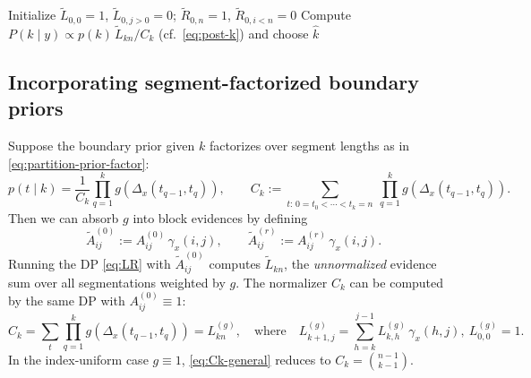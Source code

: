 \begin{algorithm}[H]
\caption{Generic algebraic DP for EF segmentation (prefix/suffix form)}
\label{alg:dp-core}
Initialize $\widetilde{L}_{0,0}=1$, $\widetilde{L}_{0,j>0}=0$; $\widetilde{R}_{0,n}=1$, $\widetilde{R}_{0,i<n}=0$\;
Compute $P(k\mid y)\propto p(k)\,\widetilde{L}_{k n}/C_k$ (cf.\ \eqref{eq:post-k}) and choose $\widehat{k}$\;
\end{algorithm}

\subsection{Incorporating segment-factorized boundary priors}
\label{subsec:priorinc}

Suppose the boundary prior given $k$ factorizes over segment lengths as in \eqref{eq:partition-prior-factor}:
\[
p(t\mid k) = \frac{1}{C_k}\prod_{q=1}^k g(\Delta_x(t_{q-1},t_q)),
\qquad
C_k := \sum_{t:\,0=t_0<\cdots<t_k=n}\ \prod_{q=1}^k g(\Delta_x(t_{q-1},t_q)).
\]
Then we can absorb $g$ into block evidences by defining
\begin{equation}
\widetilde{A}^{(0)}_{ij} := A^{(0)}_{ij}\,\gamma_x(i,j),
\qquad
\widetilde{A}^{(r)}_{ij} := A^{(r)}_{ij}\,\gamma_x(i,j).
\label{eq:Atilde}
\end{equation}
Running the DP \eqref{eq:LR} with $\widetilde{A}^{(0)}_{ij}$ computes $\widetilde{L}_{k n}$,
the \emph{unnormalized} evidence sum over all segmentations weighted by $g$. The normalizer
$C_k$ can be computed by the same DP with $A^{(0)}_{ij}\equiv 1$:
\begin{equation}
C_k
 = \sum_{t}\prod_{q=1}^k g(\Delta_x(t_{q-1},t_q))
 = L^{(g)}_{k n},
\quad\text{where}\quad
L^{(g)}_{k+1,j}=\sum_{h=k}^{j-1}L^{(g)}_{k,h}\,\gamma_x(h,j),\ L^{(g)}_{0,0}=1.
\label{eq:Ck-general}
\end{equation}
In the index-uniform case $g\equiv 1$, \eqref{eq:Ck-general} reduces to $C_k=\binom{n-1}{k-1}$.

